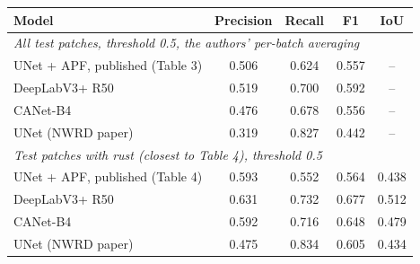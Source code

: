 \begin{tabular}{lcccc}
\toprule
Model & Precision & Recall & F1 & IoU \\
\midrule
\multicolumn{5}{l}{\emph{All test patches, threshold 0.5, the authors' per-batch averaging}} \\
UNet + APF, published (Table 3) & 0.506 & 0.624 & 0.557 & -- \\
DeepLabV3+ R50 & 0.519 & 0.700 & 0.592 & -- \\
CANet-B4 & 0.476 & 0.678 & 0.556 & -- \\
UNet (NWRD paper) & 0.319 & 0.827 & 0.442 & -- \\
\midrule
\multicolumn{5}{l}{\emph{Test patches with rust (closest to Table 4), threshold 0.5}} \\
UNet + APF, published (Table 4) & 0.593 & 0.552 & 0.564 & 0.438 \\
DeepLabV3+ R50 & 0.631 & 0.732 & 0.677 & 0.512 \\
CANet-B4 & 0.592 & 0.716 & 0.648 & 0.479 \\
UNet (NWRD paper) & 0.475 & 0.834 & 0.605 & 0.434 \\
\bottomrule
\end{tabular}
